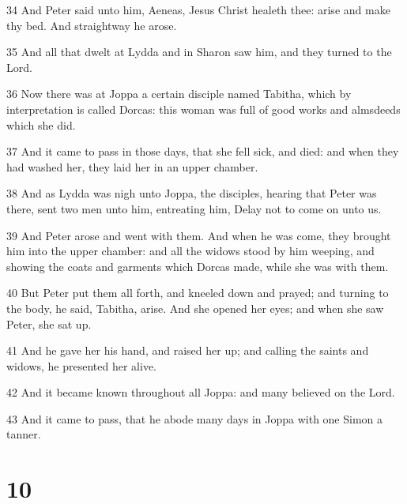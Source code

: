 \par 34 And Peter said unto him, Aeneas, Jesus Christ healeth thee: arise and make thy bed. And straightway he arose.
\par 35 And all that dwelt at Lydda and in Sharon saw him, and they turned to the Lord.
\par 36 Now there was at Joppa a certain disciple named Tabitha, which by interpretation is called Dorcas: this woman was full of good works and almsdeeds which she did.
\par 37 And it came to pass in those days, that she fell sick, and died: and when they had washed her, they laid her in an upper chamber.
\par 38 And as Lydda was nigh unto Joppa, the disciples, hearing that Peter was there, sent two men unto him, entreating him, Delay not to come on unto us.
\par 39 And Peter arose and went with them. And when he was come, they brought him into the upper chamber: and all the widows stood by him weeping, and showing the coats and garments which Dorcas made, while she was with them.
\par 40 But Peter put them all forth, and kneeled down and prayed; and turning to the body, he said, Tabitha, arise. And she opened her eyes; and when she saw Peter, she sat up.
\par 41 And he gave her his hand, and raised her up; and calling the saints and widows, he presented her alive.
\par 42 And it became known throughout all Joppa: and many believed on the Lord.
\par 43 And it came to pass, that he abode many days in Joppa with one Simon a tanner.

\chapter{10}


